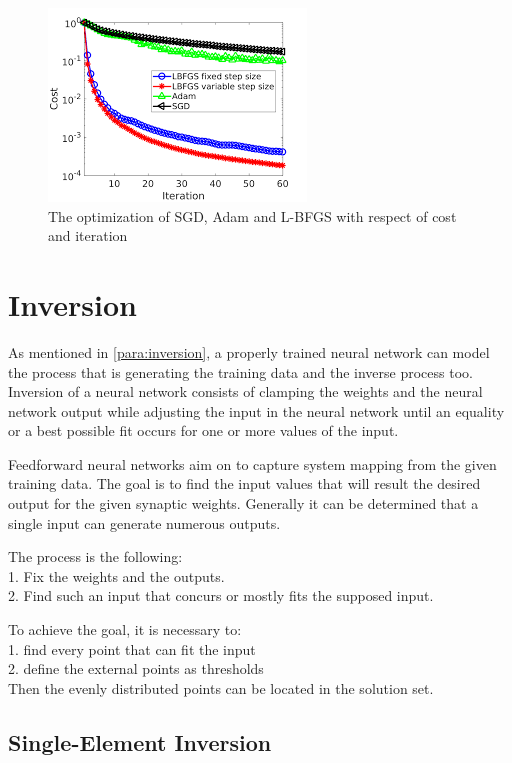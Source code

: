 \begin{figure}[h]
	\centering
	\includegraphics[height=0.34\linewidth]{./figures/optimization}
	\caption{The optimization of SGD, Adam and L-BFGS with respect of cost and iteration}
	\label{fig:optimization}
\end{figure}



\section{Inversion}

As mentioned in \autoref{para:inversion}, a properly trained neural network can model the process that is generating the training data and the inverse process too. Inversion of a neural network consists of clamping the weights and the neural network output while adjusting the input in the neural network until an equality or a best possible fit occurs for one or more values of the input. \medskip

Feedforward neural networks aim on to capture system mapping from the given training data. The goal is to find the input values that will result the desired output for the given synaptic weights. Generally it can be determined that a single input can generate numerous outputs. \bigskip

\noindent The process is the following:\\
1. Fix the weights and the outputs.\\
2. Find such an input that concurs or mostly fits the supposed input. \medskip

\noindent To achieve the goal, it is necessary to:\\
1. find every point that can fit the input\\
2. define the external points as thresholds\\
Then the evenly distributed points can be located in the solution set.



\subsection{Single-Element Inversion}

